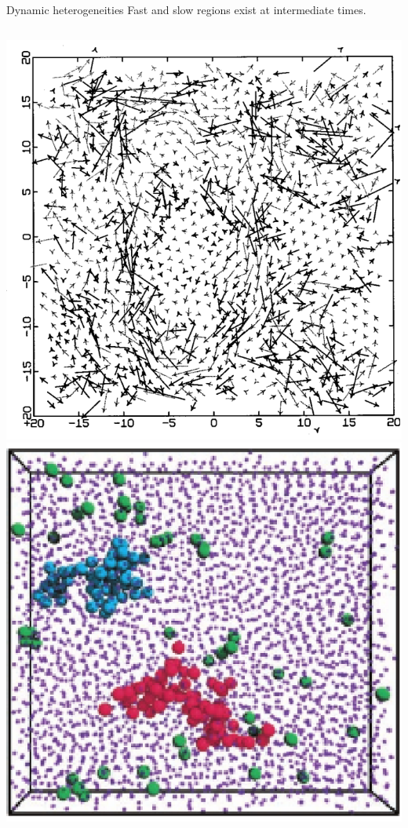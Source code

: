 \begin{frame}{Dynamic heterogeneities}
	Fast and slow regions exist at intermediate times.
	\begin{columns}[t]
	\includegraphics[width=\columnwidth]{dh_perera}
	\includegraphics[width=\columnwidth]{dh_weeks}\\
	\end{columns}
	
	\bigskip
	\begin{footnotesize}
	\begin{columns}
	\end{columns}
	\end{footnotesize}
\end{frame}

